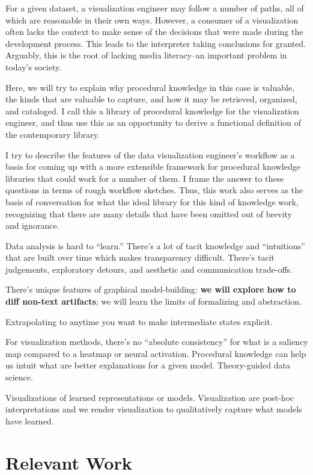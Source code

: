 \documentclass[
]{article}
\begin{document}
For a given dataset, a visualization engineer may follow a number of
paths, all of which are reasonable in their own ways. However, a
consumer of a visualization often lacks the context to make sense of the
decisions that were made during the development process. This leads to
the interpreter taking conclusions for granted. Arguably, this is the
root of lacking media literacy--an important problem in today's society.

Here, we will try to explain why procedural knowledge in this case is
valuable, the kinds that are valuable to capture, and how it may be
retrieved, organized, and cataloged. I call this a library of procedural
knowledge for the visualization engineer, and thus use this as an
opportunity to derive a functional definition of the contemporary
library.

I try to describe the features of the data visualization engineer's
workflow as a basis for coming up with a more extensible framework for
procedural knowledge libraries that could work for a number of them. I
frame the answer to these questions in terms of rough workflow sketches.
Thus, this work also serves as the basis of conversation for what the
ideal library for this kind of knowledge work, recognizing that there
are many details that have been omitted out of brevity and ignorance.

Data analysis is hard to ``learn.'' There's a lot of tacit knowledge and
``intuitions'' that are built over time which makes transparency
difficult. There's tacit judgements, exploratory detours, and aesthetic
and communication trade-offs.

There's unique features of graphical model-building: \textbf{we will
explore how to diff non-text artifacts}; we will learn the limits of
formalizing and abstraction.

Extrapolating to anytime you want to make intermediate states explicit.

For visualization methods, there's no ``absolute consistency'' for what
is a saliency map compared to a heatmap or neural activation. Procedural
knowledge can help us intuit what are better explanations for a given
model. Theory-guided data science.

Visualizations of learned representations or models. Visualization are
post-hoc interpretations and we render visualization to qualitatively
capture what models have learned.

\section{Relevant Work}\label{relevant-work}
\end{document}
